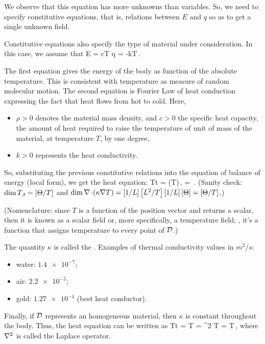 We observe that this equation has more unknowns than variables. So, we need to specify constitutive equations, that is, relations between $E$ and $q$ so as to get a single unknown field.

Constitutive equations also specify the type of material under consideration. In this case, we assume that
\beq
E = \rho cT\qquad{}\qquad 
q = -k\gder T\,.
\eeq

The first equation gives the energy of the body as function of the absolute temperature. This is consistent with temperature as measure of random molecular motion. The second equation is Fourier Law of heat conduction expressing the fact that heat flows from hot to cold. Here,
\begin{itemize}
\item $\rho > 0$ denotes the material mass density, and $c > 0$ the specific heat capacity, the amount of heat required to raise the temperature of unit of mass of the material, at temperature $T$, by one degree,
%
\item $k > 0$ represents the heat conductivity.
\end{itemize}

So, substituting the previous constitutive relations into the equation of balance of energy (local form), we get the heat equation:
\beq
\xpd Tt = \gder\iprod(\kappa\gder T)\,, \quad{}\quad \kappa = \,.
\eeq
(Sanity check: $\dim{T}_{,{t}} = \left[{\Theta/T}\right]$ and $\dim \nabla\operatorname{\cdot}(\kappa\nabla T) = \left[{1/L}\right]\left[{L^2/T}\right]\left[{1/L}\right]\left[{\Theta}\right] = \left[{\Theta/T}\right]$.)

(Nomenclature: since $T$ is a function of the position vector and returns a scalar, then it is known as a scalar field or, more specifically, a temperature field; \ie, it's a function that assigns temperature to every point of $\mathcal{D}$.)

The quantity $\kappa$ is called the . Examples of thermal conductivity values in $\si{m^2/s}$:
\begin{itemize}
\item water: $\num{1.4e-7}$;
\item air: $\num{2.2e-5}$;
\item gold: $\num{1.27e-4}$ (best heat conductor).
\end{itemize}

Finally, if $\mathcal{D}$ represents an homogeneous material, then $\kappa$ is constant throughout the body. Thus, the heat equation can be written as
\beq
\xpd Tt = \kappa\gder\iprod\gder T = \kappa\gder^2 T = \kappa\lder T\,,
\eeq
where $\nabla^2$ is called the Laplace operator.

